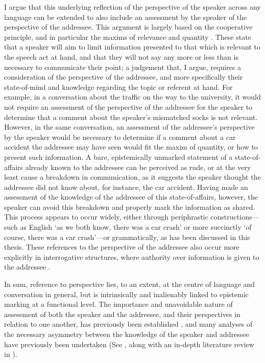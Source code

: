 I argue that this underlying reflection of the perspective of the speaker across any language can be extended to also include an assessment by the speaker of the perspective of the addressee. This argument is largely based on the cooperative principle, and in particular the maxims of relevance and quantity \cite{Grice1989}. These state that a speaker will aim to limit information presented to that which is relevant to the speech act at hand, and that they will not say any more or less than is necessary to communicate their point; a judgement that, I argue, requires a consideration of the perspective of the addressee, and more specifically their state-of-mind and knowledge regarding the topic or referent at hand. For example, in a conversation about the traffic on the way to the university, it would not require an assessment of the perspective of the addressee for the speaker to determine that a comment about the speaker's mismatched socks is not relevant. However, in the same conversation, an assessment of the addressee's perspective by the speaker would be necessary to determine if a comment about a car accident the addressee may have seen would fit the maxim of quantity, or how to present such information. A bare, epistemically unmarked statement of a state-of-affairs already known to the addressee can be perceived as rude, or at the very least cause a breakdown in communication, as it suggests the speaker thought the addressee did not know about, for instance, the car accident. Having made an assessment of the knowledge of the addressee of this state-of-affairs, however, the speaker can avoid this breakdown and properly mark the information as shared. This process appears to occur widely, either through periphrastic constructions---such as English `as we both know, there was a car crash' or more succinctly `of course, there was a car crash'---or grammatically, as has been discussed in this thesis. These references to the perspective of the addressee also occur more explicitly in interrogative structures, where authority over information is given to the addressee \cite{Hill2020}.

In sum, reference to perspective lies, to an extent, at the centre of language and conversation in general, but is intrinsically and inalienably linked to epistemic marking at a functional level. The importance and unavoidable nature of assessment of both the speaker and the addressee, and their perspectives in relation to one another, has previously been established \cite{Heritage2012}, and many analyses of the necessary asymmetry between the knowledge of the speaker and addressee have previously been undertaken (See , along with an in-depth literature review in ).

